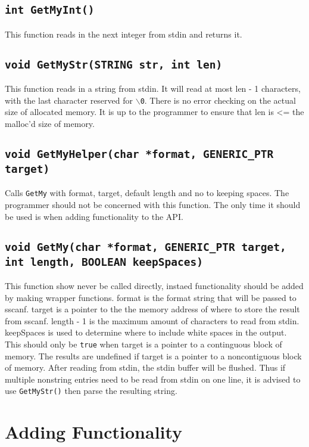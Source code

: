 \documentclass[11pt]{article}
\begin{document}
\subsection{\texttt{int GetMyInt()}}
This function reads in the next integer from stdin and returns it.

\subsection{\texttt{void GetMyStr(STRING str, int len)}}
This function reads in a string from stdin. It will read at most len - 1 characters, with the last character reserved for \texttt{$\backslash$0}. There is no error checking on the actual size of allocated memory. It is up to the programmer to ensure that len is \textless= the malloc'd size of memory. 

\subsection{\texttt{void GetMyHelper(char *format, GENERIC\_PTR target)}}
Calls \texttt{GetMy} with format, target, default length and no to keeping spaces. The programmer should not be concerned with this function. The only time it should be used is when adding functionality to the API.

\subsection{\texttt{void GetMy(char *format, GENERIC\_PTR target, int length, BOOLEAN keepSpaces)}}
This function show never be called directly, instaed functionality should be added by making wrapper functions. format is the format string that will be passed to sscanf. target is a pointer to the the memory address of where to store the result from sscanf. length - 1 is the maximum amount of characters to read from stdin. keepSpaces is used to determine where to include white spaces in the output. This should only be \texttt{true} when target is a pointer to a continguous block of memory. The results are undefined if target is a pointer to a noncontiguous block of memory. After reading from stdin, the stdin buffer will be flushed. Thus if multiple nonstring entries need to be read from stdin on one line, it is advised to use \texttt{GetMyStr()} then parse the resulting string.

\section{Adding Functionality}
\end{document}
